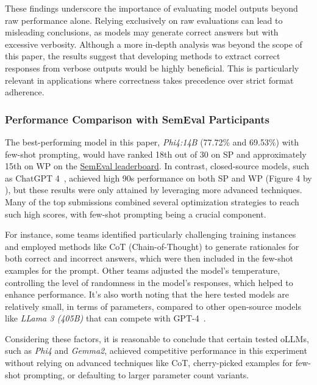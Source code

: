 These findings underscore the importance of evaluating model outputs beyond raw performance alone. Relying exclusively on raw evaluations can lead to misleading conclusions, as models may generate correct answers but with excessive verbosity. Although a more in-depth analysis was beyond the scope of this paper, the results suggest that developing methods to extract correct responses from verbose outputs would be highly beneficial. This is particularly relevant in applications where correctness takes precedence over strict format adherence.

\subsubsection{Performance Comparison with SemEval Participants}

The best-performing model in this paper, \textit{Phi4:14B} (77.72\% and 69.53\%) with few-shot prompting, would have ranked 18th out of 30 on \ac{SP} and approximately 15th on \ac{WP} on the \href{https://brainteasersem.github.io/#leaderboard}{SemEval leaderboard}. In contrast, closed-source models, such as ChatGPT 4~\cite{openaiGPT4TechnicalReport2024}, achieved high 90s performance on both \ac{SP} and \ac{WP} (Figure 4 by \textcite{jiangSemEval2024Task92024}), but these results were only attained by leveraging more advanced techniques. Many of the top submissions combined several optimization strategies to reach such high scores, with few-shot prompting being a crucial component.

For instance, some teams identified particularly challenging training instances and employed methods like \ac{CoT} (Chain-of-Thought) to generate rationales for both correct and incorrect answers, which were then included in the few-shot examples for the prompt. Other teams adjusted the model's temperature, controlling the level of randomness in the model's responses, which helped to enhance performance.  It's also worth noting that the here tested models are relatively small, in terms of parameters, compared to other open-source models like \textit{LLama 3 (405B)} that can compete with GPT-4~\cite{grattafioriLlama3Herd2024,openaiGPT4TechnicalReport2024}.

Considering these factors, it is reasonable to conclude that certain tested \acp{oLLM}, such as \textit{Phi4} and \textit{Gemma2}, achieved competitive performance in this experiment without relying on advanced techniques like \ac{CoT}, cherry-picked examples for few-shot prompting, or defaulting to larger parameter count variants.

